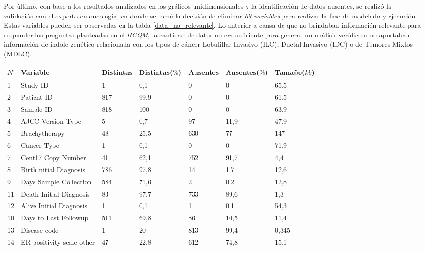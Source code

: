 Por último, con base a los resultados analizados en los gráficos unidimensionales y la identificación de datos ausentes, se realizó la validación con el experto en oncología, en donde se tomó la decisión de eliminar \textit{69 variables} para realizar la fase de modelado y ejecución. Estas variables pueden ser observadas en la tabla \ref{data_no_relevante}. Lo anterior a causa de que no brindaban información relevante para responder las preguntas planteadas en el \textit{BCQM}, la cantidad de datos no era suficiente para generar un análisis verídico o no aportaban información de índole genético relacionada con los tipos de cáncer Lobulillar Invasivo (ILC), Ductal Invasivo (IDC) o de Tumores Mixtos (MDLC).

\begin{table}[!htb]
	\footnotesize
	\centering
	\begin{threeparttable}
		\begin{tabular}{p{0.5cm} p{4cm} p{1.5cm} p{2cm} p{1.5cm} p{2cm} p{1.5cm}} \toprule
			$N$  &Variable &Distintas &Distintas($\%$) &Ausentes &Ausentes($\%$)  &Tamaño($kb$)
			\\ \hline	1	&	Study ID	&	1	&	0,1	&	0	&	0	&	65,5
			\\ \hline	2	&	Patient ID	&	817	&	99,9	&	0	&	0	&	61,5
			\\ \hline	3	&	Sample ID	&	818	&	100	&	0	&	0	&	63,9
			\\ \hline	4	&	AJCC Version Type	&	5	&	0,7	&	97	&	11,9	&	47,9
			\\ \hline	5	&	Brachytherapy 	&	48	&	25,5	&	630	&	77	&	147
			\\ \hline	6	&	Cancer Type	&	1	&	0,1	&	0	&	0	&	71,9
			\\ \hline	7	&	Cent17 Copy Number	&	41	&	62,1	&	752	&	91,7	&	4,4
			\\ \hline	8	&	Birth nitial Diagnosis 	&	786	&	97,8	&	14	&	1,7	&	12,6
			\\ \hline	9	&	Days Sample Collection	&	584	&	71,6	&	2	&	0,2	&	12,8
			\\ \hline	11	&	Death Initial Diagnosis 	&	83	&	97,7	&	733	&	89,6	&	1,3
			\\ \hline	12	&	Alive Initial Diagnosis	&	1	&	0,1	&	1	&	0,1	&	54,3
			\\ \hline	10	&	Days to Last Followup	&	511	&	69,8	&	86	&	10,5	&	11,4
			\\ \hline	13	&	Disease code	&	1	&	20	&	813	&	99,4	&	0,345
			\\ \hline	14	&	ER positivity scale other	&	47	&	22,8	&	612	&	74,8	&	15,1

\end{tabular}
\end{threeparttable}
\end{table}
